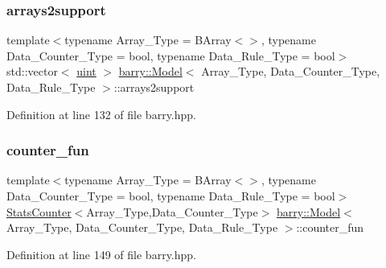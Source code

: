 \mbox{\label{classbarry_1_1_model_a9cd0e9c9d29df6637ab30ebe3daeeff7}} 
\subsubsection{\texorpdfstring{arrays2support}{arrays2support}}
{\footnotesize\ttfamily template$<$typename Array\+\_\+\+Type  = B\+Array$<$$>$, typename Data\+\_\+\+Counter\+\_\+\+Type  = bool, typename Data\+\_\+\+Rule\+\_\+\+Type  = bool$>$ \\
std\+::vector$<$ \hyperlink{namespacebarry_a11dfc53ddb4672278319aa04f1e09a6c}{uint} $>$ \hyperlink{classbarry_1_1_model}{barry\+::\+Model}$<$ Array\+\_\+\+Type, Data\+\_\+\+Counter\+\_\+\+Type, Data\+\_\+\+Rule\+\_\+\+Type $>$\+::arrays2support}



Definition at line 132 of file barry.\+hpp.

\mbox{\label{classbarry_1_1_model_ada40ca4ec8b21a3dbbe646edbfb1df45}} 
\subsubsection{\texorpdfstring{counter\+\_\+fun}{counter\_fun}}
{\footnotesize\ttfamily template$<$typename Array\+\_\+\+Type  = B\+Array$<$$>$, typename Data\+\_\+\+Counter\+\_\+\+Type  = bool, typename Data\+\_\+\+Rule\+\_\+\+Type  = bool$>$ \\
\hyperlink{classbarry_1_1_stats_counter}{Stats\+Counter}$<$Array\+\_\+\+Type,Data\+\_\+\+Counter\+\_\+\+Type$>$ \hyperlink{classbarry_1_1_model}{barry\+::\+Model}$<$ Array\+\_\+\+Type, Data\+\_\+\+Counter\+\_\+\+Type, Data\+\_\+\+Rule\+\_\+\+Type $>$\+::counter\+\_\+fun}



Definition at line 149 of file barry.\+hpp.

\mbox{\label{classbarry_1_1_model_aea013a7ac325ece7564e8ea9cdf441a2}} 
